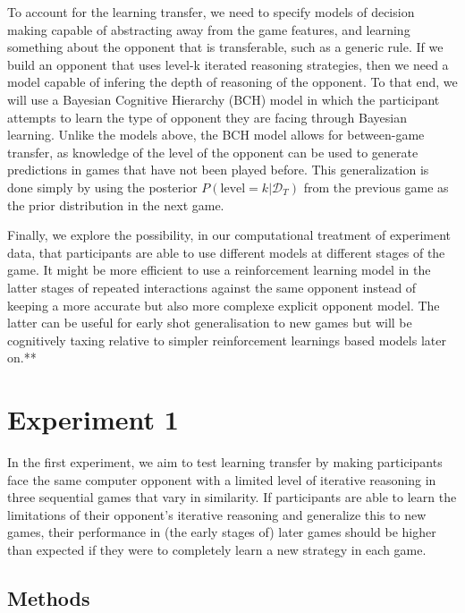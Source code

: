 \documentclass[smallextended]{svjour3}       %
\begin{document}
To account for the learning transfer, we need to specify models of
decision making capable of abstracting away from the game features, and
learning something about the opponent that is transferable, such as a
generic rule. If we build an opponent that uses level-k iterated
reasoning strategies, then we need a model capable of infering the depth
of reasoning of the opponent. To that end, we will use a Bayesian
Cognitive Hierarchy (BCH) model in which the participant attempts to
learn the type of opponent they are facing through Bayesian learning.
Unlike the models above, the BCH model allows for between-game transfer,
as knowledge of the level of the opponent can be used to generate
predictions in games that have not been played before. This
generalization is done simply by using the posterior
\(P(\text{level} = k|\mathcal{D}_T)\) from the previous game as the
prior distribution in the next game.

Finally, we explore the possibility, in our computational treatment of
experiment data, that participants are able to use different models at
different stages of the game. It might be more efficient to use a
reinforcement learning model in the latter stages of repeated
interactions against the same opponent instead of keeping a more
accurate but also more complexe explicit opponent model. The latter can
be useful for early shot generalisation to new games but will be
cognitively taxing relative to simpler reinforcement learnings based
models later on.**

\hypertarget{experiment-1}{%
\section{Experiment 1}\label{experiment-1}}

In the first experiment, we aim to test learning transfer by making
participants face the same computer opponent with a limited level of
iterative reasoning in three sequential games that vary in similarity.
If participants are able to learn the limitations of their opponent's
iterative reasoning and generalize this to new games, their performance
in (the early stages of) later games should be higher than expected if
they were to completely learn a new strategy in each game.

\hypertarget{methods}{%
\subsection{Methods}\label{methods}}
\end{document}
